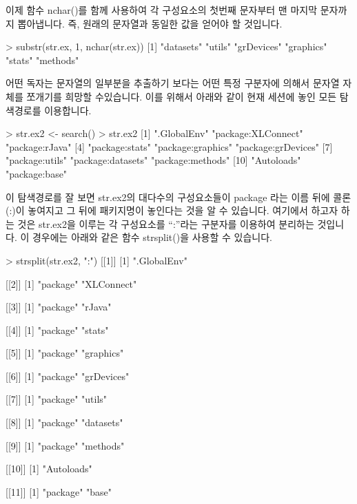 \documentclass[tutorial.tex]{subfiles}
\begin{document}
이제 함수 nchar()를 함께 사용하여 각 구성요소의 첫번째 문자부터 맨 마지막 문자까지 뽑아냅니다. 
즉, 원래의 문자열과 동일한 값을 얻어야 할 것입니다. 

\begin{Schunk}
\begin{Soutput} 
> substr(str.ex, 1, nchar(str.ex))
[1] "datasets"  "utils"     "grDevices" "graphics"  "stats"     "methods"  
\end{Soutput}
\end{Schunk}

어떤 독자는 문자열의 일부분을 추출하기 보다는 어떤 특정 구분자에 의해서 문자열 자체를 쪼개기를 희망할 수있습니다. 
이를 위해서 아래와 같이 현재 세션에 놓인 모든 탐색경로를 이용합니다. 

\begin{Schunk}
\begin{Soutput} 
> str.ex2 <- search()
> str.ex2
 [1] ".GlobalEnv"        "package:XLConnect" "package:rJava"    
 [4] "package:stats"     "package:graphics"  "package:grDevices"
 [7] "package:utils"     "package:datasets"  "package:methods"  
[10] "Autoloads"         "package:base"     
\end{Soutput}
\end{Schunk}

이 탐색경로를 잘 보면 str.ex2의 대다수의 구성요소들이 package 라는 이름 뒤에 콜론 (:)이 놓여지고 그 뒤에 패키지명이 놓인다는 것을 알 수 있습니다.
여기에서 하고자 하는 것은 str.ex2을 이루는 각 구성요소를 ``:''라는 구분자를 이용하여 분리하는 것입니다.
이 경우에는 아래와 같은 함수 strsplit()을 사용할 수 있습니다. 

\begin{Schunk}
\begin{Soutput} 
> strsplit(str.ex2, ":")
[[1]]
[1] ".GlobalEnv"

[[2]]
[1] "package"   "XLConnect"

[[3]]
[1] "package" "rJava"  

[[4]]
[1] "package" "stats"  

[[5]]
[1] "package"  "graphics"

[[6]]
[1] "package"   "grDevices"

[[7]]
[1] "package" "utils"  

[[8]]
[1] "package"  "datasets"

[[9]]
[1] "package" "methods"

[[10]]
[1] "Autoloads"

[[11]]
[1] "package" "base"   
\end{Soutput}
\end{Schunk}
\end{document}

